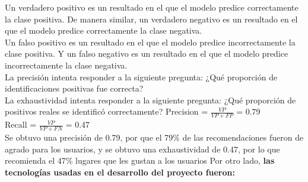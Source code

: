 \documentclass[12pt,letterpaper,openany]{book}
\begin{document}
Un verdadero positivo es un resultado en el que el modelo predice correctamente la clase positiva. De manera similar, un verdadero negativo es un resultado en el que el modelo predice correctamente la clase negativa.\\
Un falso positivo es un resultado en el que el modelo predice incorrectamente la clase positiva. Y un falso negativo es un resultado en el que el modelo predice incorrectamente la clase negativa.\\
La precisión intenta responder a la siguiente pregunta: ¿Qué proporción de identificaciones positivas fue correcta?\\
La exhaustividad intenta responder a la siguiente pregunta: ¿Qué proporción de positivos reales se identificó correctamente?\cite{13}\cite{26}
\vspace{5mm}\newline
Precision = $\frac{VP}{VP+FP}$ = 0.79 \\
Recall = $\frac{VP}{VP+FN}$ = 0.47\\
\newline
Se obtuvo una precisión de 0.79, por que el 79\% de las recomendaciones fueron de agrado para los usuarios, y se obtuvo una exhaustividad de 0.47, por lo que recomienda el 47\% lugares que les gustan a los usuarios
\vspace{5mm}\newline
Por otro lado, \textbf{las tecnologías usadas en el desarrollo del proyecto fueron:}
\end{document}
